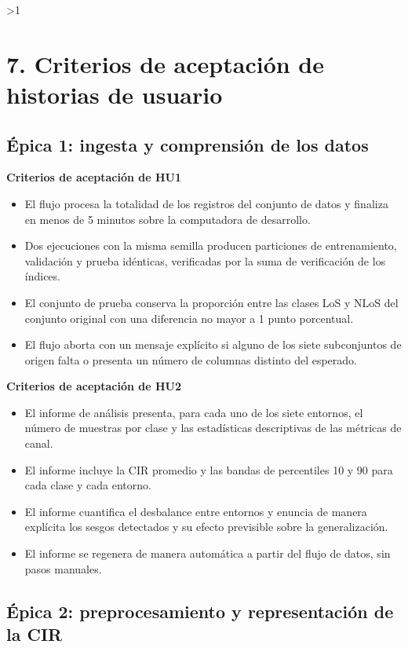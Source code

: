 \documentclass[
11pt, %
]{charter}
\providecommand{\revision}{1}
\begin{document}
\ifnum\revision>1
\section{7. Criterios de aceptación de historias de usuario}
\label{sec:criteriosAceptacion}

\subsection{Épica 1: ingesta y comprensión de los datos}

\textbf{Criterios de aceptación de HU1}
\begin{itemize}
    \item El flujo procesa la totalidad de los registros del conjunto de datos y finaliza en menos de 5 minutos sobre la computadora de desarrollo.
    \item Dos ejecuciones con la misma semilla producen particiones de entrenamiento, validación y prueba idénticas, verificadas por la suma de verificación de los índices.
    \item El conjunto de prueba conserva la proporción entre las clases LoS y NLoS del conjunto original con una diferencia no mayor a 1 punto porcentual.
    \item El flujo aborta con un mensaje explícito si alguno de los siete subconjuntos de origen falta o presenta un número de columnas distinto del esperado.
\end{itemize}

\textbf{Criterios de aceptación de HU2}
\begin{itemize}
    \item El informe de análisis presenta, para cada uno de los siete entornos, el número de muestras por clase y las estadísticas descriptivas de las métricas de canal.
    \item El informe incluye la CIR promedio y las bandas de percentiles 10 y 90 para cada clase y cada entorno.
    \item El informe cuantifica el desbalance entre entornos y enuncia de manera explícita los sesgos detectados y su efecto previsible sobre la generalización.
    \item El informe se regenera de manera automática a partir del flujo de datos, sin pasos manuales.
\end{itemize}

\subsection{Épica 2: preprocesamiento y representación de la CIR}
\end{document}
